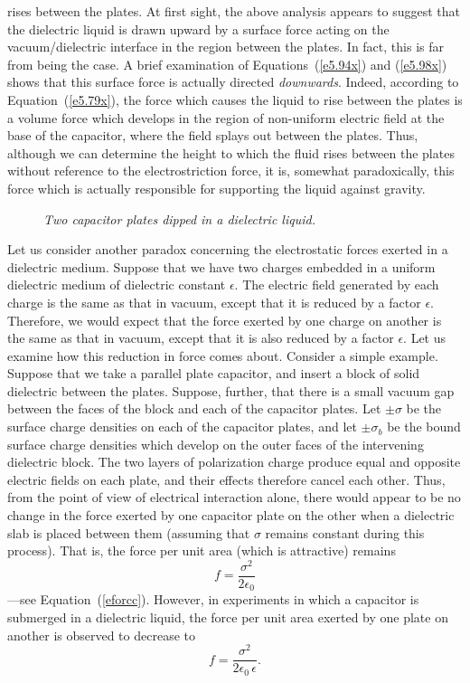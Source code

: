 rises between the plates.
At first sight,  the above analysis appears  to suggest that
the dielectric liquid is drawn upward by a  surface force
acting on the vacuum/dielectric interface in the
region between the plates. In fact, this is far from being the
case. A brief examination of Equations~(\ref{e5.94x}) and (\ref{e5.98x}) shows that this surface force 
is actually directed {\em downwards}. 
Indeed, according to Equation~(\ref{e5.79x}), the force which causes the liquid to
rise between the plates
is a volume force which develops in the region of non-uniform electric
field  at the base of the capacitor, where the field splays out  between
the plates. Thus, although we can determine the height to which the fluid
rises between the plates without reference to the electrostriction force,
it is, somewhat paradoxically, this force which is actually
responsible for supporting the liquid against gravity. 
\begin{figure}
\centerline{}
\caption{\em Two capacitor plates dipped in a dielectric liquid.}\label{fcapt}
\end{figure}

Let us consider another paradox concerning the electrostatic forces
exerted in a dielectric medium. Suppose that we have two charges
embedded in a uniform dielectric medium of dielectric constant $\epsilon$. The electric field generated
by each charge is the same as that in vacuum, except that it is reduced
by a factor $\epsilon$. Therefore, we would expect that the force exerted by 
one charge on another is the same as that in vacuum, except that it
is also reduced by a factor $\epsilon$. Let us examine how
this reduction in force comes about. Consider a simple example.
Suppose that we take a parallel plate capacitor, and insert a block
of solid dielectric between the plates. Suppose, further, that there is
a small vacuum gap between the faces of the block and each of
the capacitor plates. Let $\pm\sigma$ be the surface charge densities
on each of the capacitor plates, and let $\pm\sigma_b$ be the bound
surface charge densities  which develop on the outer faces of the intervening dielectric
block. The two layers of polarization charge produce equal and opposite 
electric fields on each plate, and their effects therefore cancel each other.
Thus, from the point of view of electrical interaction alone, there would 
appear to be no change in the force exerted by one capacitor plate on the
 other
when a dielectric slab is placed between them (assuming that $\sigma$ remains
constant during this process). That is, the force per unit
area (which is attractive) remains
\begin{equation}\label{e5.104x}
f = \frac{\sigma^2}{2\epsilon_0}
\end{equation}
---see Equation~(\ref{eforcc}).
However, in experiments in which a capacitor is submerged
in a dielectric liquid, the force per unit area exerted by one plate
on another is observed to decrease to
\begin{equation}
f = \frac{\sigma^2}{2\epsilon_0\,\epsilon}.
\end{equation}


